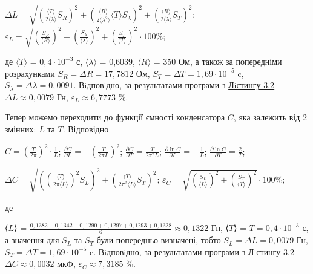 \documentclass[12pt,a4paper]{article}
\begin{document}
    \begin{center}

        $\displaystyle \Delta L = \sqrt{\left( \frac{\text{⟨}T\text{⟩}}{2\text{⟨}\lambda\text{⟩}} S_{R} \right)^2 + \left( \frac{\text{⟨}R\text{⟩}}{2\text{⟨}\lambda^2\text{⟩}} \text{⟨}T\text{⟩} S_{\lambda}\right)^2 + \left( \frac{\text{⟨}R\text{⟩}}{2\text{⟨}\lambda\text{⟩}} S_T \right)^2}$;
        $\displaystyle \varepsilon_L = \sqrt{\left( \frac{S_{R}}{\text{⟨}R\text{⟩}} \right)^2 + \left( \frac{S_{\lambda}}{\text{⟨}\lambda\text{⟩}} \right)^2 + \left( \frac{S_{T}}{\text{⟨}T\text{⟩}} \right)^2} \cdot 100 \%$;

    \end{center}

    де $\text{⟨}T\text{⟩}$ = $0,4 \cdot 10^{-3}$ с, $\text{⟨}\lambda\text{⟩}$ = 0,6039, $\text{⟨}R\text{⟩}$ = 350 Ом, а також за попередніми розрахунками $S_R = \Delta R = 17,7812$ Ом, $S_T = \Delta T = 1,69 \cdot 10^{-5}$ c,
    $S_{\lambda} = \Delta \lambda = 0,0091$. Вiдповiдно, за результатами програми з \hyperlink{listing2}{Лiстингу 3.2} $\Delta L \approx 0,0079$ Гн, $\varepsilon_L \approx 6,7773$ \%.

    Тепер можемо переходити до функції ємності конденсатора $C$, яка залежить від 2 змінних: $L$ та $T$. Відповідно

    \begin{center}
        $\displaystyle C = \left( \frac{T}{2\pi} \right)^2 \cdot \frac{1}{L}$; $\displaystyle \frac{\partial C}{\partial L} = -\left( \frac{T}{2\pi L} \right)^2$; $\displaystyle \frac{\partial C}{\partial T} = \frac{T}{2\pi^2 L}$;
        $\displaystyle \frac{\partial \ln C}{\partial L} = -\frac{1}{L}$; $\displaystyle \frac{\partial \ln C}{\partial T} = \frac{2}{T}$;
    \end{center}

    \begin{center}
        $\displaystyle \Delta C = \sqrt{\left( \left( \frac{\text{⟨}T\text{⟩}}{2\pi\text{⟨}L\text{⟩}} \right)^2 S_{L} \right)^2 + \left( \frac{\text{⟨}T\text{⟩}}{2\pi^2\text{⟨}L\text{⟩}} S_T \right)^2}$;
        $\displaystyle \varepsilon_C = \sqrt{\left( \frac{S_{L}}{\text{⟨}L\text{⟩}} \right)^2 + \left( \frac{S_{T}}{\text{⟨}T\text{⟩}} \right)^2} \cdot 100 \%$;
    \end{center}

    де

    ⟨$L$⟩ = $\displaystyle \frac{0,1382 + 0,1342 + 0,1290 + 0,1297 + 0,1293 + 0,1328}{6} \approx 0,1322$ Гн, ⟨$T$⟩ = $T = 0,4 \cdot 10^{-3}$ с, а значення для $S_L$ та $S_T$ були попередньо визначені, тобто $S_{L} = \Delta L = 0,0079$ Гн,
    $S_T = \Delta T = 1,69 \cdot 10^{-5}$ c. Вiдповiдно, за результатами програми з \hyperlink{listing2}{Лiстингу 3.2} $\Delta C \approx 0,0032$ мкФ, $\varepsilon_C \approx 7,3185$ \%.
\end{document}
